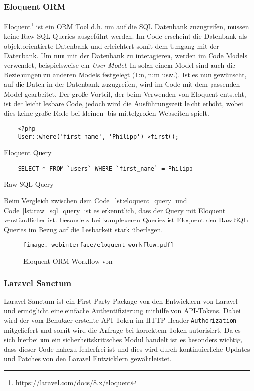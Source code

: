 \subsubsection{Eloquent ORM}
Eloquent\footnote{\url{https://laravel.com/docs/8.x/eloquent}} ist ein \ac*{ORM} Tool d.h. um auf die \acs*{SQL} Datenbank zuzugreifen,
müssen keine Raw \acs*{SQL} Queries ausgeführt werden. Im Code erscheint die
Datenbank als objektorientierte Datenbank und erleichtert somit dem Umgang mit
der Datenbank. Um nun mit der Datenbank zu interagieren, werden im Code Models
verwendet, beispielsweise ein \textit{User Model}. In solch einem Model sind auch die
Beziehungen zu anderen Models festgelegt (1:n, n:m usw.). Ist es nun gewünscht,
auf die Daten in der Datenbank zuzugreifen, wird im Code mit dem passenden Model
gearbeitet. Der große Vorteil, der beim Verwenden von Eloquent entsteht, ist der
leicht lesbare Code, jedoch wird die Ausführungszeit leicht erhöht, wobei dies
keine große Rolle bei kleinen- bis mittelgroßen Webseiten spielt.

\begin{listing}[H]
  \begin{verbatim}
    <?php
    User::where('first_name', 'Philipp')->first();
  \end{verbatim}
  \caption{Eloquent Query}
  \label{lst:eloquent_query}
\end{listing}

\begin{listing}[H]
  \begin{verbatim}
    SELECT * FROM `users` WHERE `first_name` = Philipp
  \end{verbatim}
  \caption{Raw SQL Query}
  \label{lst:raw_sql_query}
\end{listing}

Beim Vergleich zwischen dem Code~\ref{lst:eloquent_query} und
Code~\ref{lst:raw_sql_query} ist es erkenntlich, dass der Query mit Eloquent
verständlicher ist. Besonders bei komplexeren Queries ist Eloquent den Raw
\acs*{SQL} Queries im Bezug auf die Lesbarkeit stark überlegen.

\begin{figure}[H]
  \centering
  \texttt{[image: webinterface/eloquent\_workflow.pdf]}
  \caption{Eloquent ORM Workflow von }
\end{figure}

\subsubsection{Laravel Sanctum}
Laravel Sanctum ist ein First-Party-Package von den Entwicklern von Laravel und
ermöglicht eine einfache Authentifizierung mithilfe von API-Tokens. Dabei wird
der vom Benutzer erstellte API-Token im HTTP Header \verb|Authorization|
mitgeliefert und somit wird die Anfrage bei korrektem Token autorisiert. Da es sich hierbei um ein
sicherheitskritisches Modul handelt ist es besonders wichtig, dass dieser Code
nahezu fehlerfrei ist und dies wird durch kontinuierliche Updates und Patches
von den Laravel Entwicklern gewährleistet.
 
